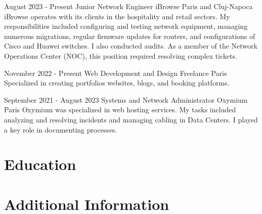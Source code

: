 \documentclass[10pt,a4paper,roman]{moderncv}
\begin{document}
\cventry
{August 2023 - Present}
{Junior Network Engineer}
{iBrowse}
{Paris and Cluj-Napoca}
{}
{iBrowse operates with its clients in the hospitality and retail sectors. My responsibilities included configuring and testing network equipment, managing numerous migrations, regular firmware updates for routers, and configurations of Cisco and Huawei switches. I also conducted audits. As a member of the Network Operations Center (NOC), this position required resolving complex tickets.\newline\newline{}
}

\cventry
{November 2022 - Present}
{Web Development and Design}
{Freelance}
{Paris}
{}
{Specialized in creating portfolios websites, blogs, and booking platforms.
\newline\newline{}
}

\cventry
{September 2021 - August 2023}
{Systems and Network Administrator}
{Oxymium}
{Paris}
{}
{Oxymium was specialized in web hosting services. My tasks included analyzing and resolving incidents and managing cabling in Data Centers. I played a key role in documenting processes.\newline\newline{}
}

\section{Education}

\section{Additional Information}

\end{document}
